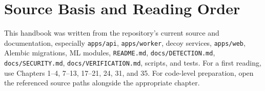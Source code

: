 \documentclass[11pt,oneside]{book}
\begin{document}
\backmatter
\chapter*{Source Basis and Reading Order}
This handbook was written from the repository's current source and documentation, especially \texttt{apps/api}, \texttt{apps/worker}, decoy services, \texttt{apps/web}, Alembic migrations, ML modules, \texttt{README.md}, \texttt{docs/DETECTION.md}, \texttt{docs/SECURITY.md}, \texttt{docs/VERIFICATION.md}, scripts, and tests. For a first reading, use Chapters 1--4, 7--13, 17--21, 24, 31, and 35. For code-level preparation, open the referenced source paths alongside the appropriate chapter.
\end{document}
